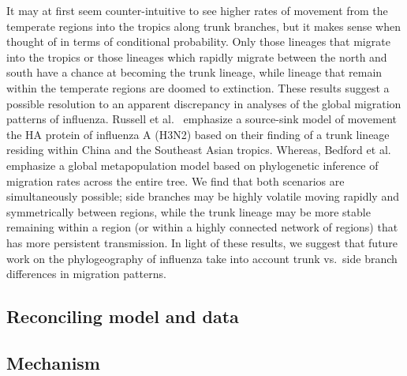 \documentclass[11pt,oneside,letterpaper]{article}
\begin{document}
It may at first seem counter-intuitive to see higher rates of movement from the temperate regions into the tropics along trunk branches, but it makes sense when thought of in terms of conditional probability.  Only those lineages that migrate into the tropics or those lineages which rapidly migrate between the north and south have a chance at becoming the trunk lineage, while lineage that remain within the temperate regions are doomed to extinction.  These results suggest a possible resolution to an apparent discrepancy in analyses of the global migration patterns of influenza.  Russell et al.\ \cite{Russell08} emphasize a source-sink model of movement the HA protein of influenza A (H3N2) based on their finding of a trunk lineage residing within China and the Southeast Asian tropics.  Whereas, Bedford et al.\ \cite{Bedford10} emphasize a global metapopulation model based on phylogenetic inference of migration rates across the entire tree.  We find that both scenarios are simultaneously possible; side branches may be highly volatile moving rapidly and symmetrically between regions, while the trunk lineage may be more stable remaining within a region (or within a highly connected network of regions) that has more persistent transmission.  In light of these results, we suggest that future work on the phylogeography of influenza take into account trunk vs.\ side branch differences in migration patterns.

\subsection*{Reconciling model and data}



\subsection*{Mechanism}
\end{document}
